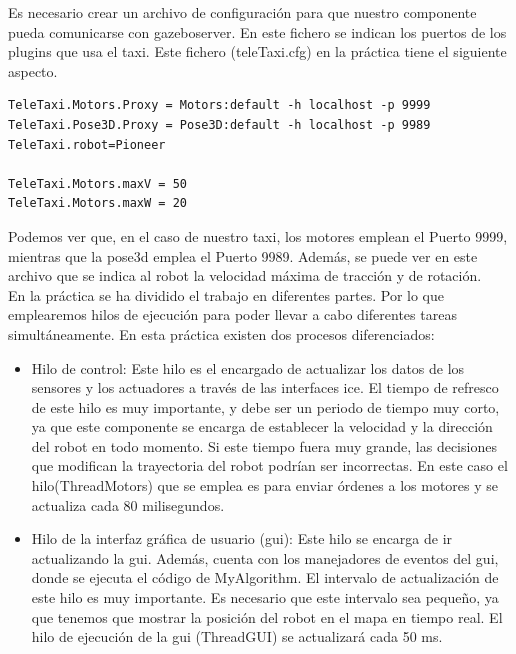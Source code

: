Es necesario crear un archivo de configuración para que nuestro componente pueda comunicarse con gazeboserver. En este fichero se indican los puertos de los plugins que usa el taxi. Este fichero (teleTaxi.cfg) en la práctica tiene el siguiente aspecto.

\vspace{20pt}
	\begin{lstlisting}[frame=single]
TeleTaxi.Motors.Proxy = Motors:default -h localhost -p 9999
TeleTaxi.Pose3D.Proxy = Pose3D:default -h localhost -p 9989
TeleTaxi.robot=Pioneer

TeleTaxi.Motors.maxV = 50
TeleTaxi.Motors.maxW = 20

	\end{lstlisting}

Podemos ver que, en el caso de nuestro taxi, los motores emplean el Puerto 9999, mientras que la pose3d emplea el Puerto 9989. Además, se puede ver en este archivo que se indica al robot la velocidad máxima de tracción y de rotación.\\


En la práctica se ha dividido el trabajo en diferentes partes. Por lo que emplearemos hilos de ejecución para poder llevar a cabo diferentes tareas simultáneamente. En esta práctica existen dos procesos diferenciados:

\begin{itemize}
\item Hilo de control: Este hilo es el encargado de actualizar los datos de los sensores y los actuadores a través de las interfaces \acrshort{ice}. El tiempo de refresco de este hilo es muy importante, y debe ser un periodo de tiempo muy corto, ya que este componente se encarga de establecer la velocidad y la dirección del robot en todo momento. Si este tiempo fuera muy grande, las decisiones que modifican la trayectoria del robot podrían ser incorrectas. En este caso el hilo(ThreadMotors) que se emplea es para enviar órdenes a los motores y se actualiza cada 80 milisegundos.

\item	Hilo de la interfaz gráfica de usuario (\acrshort{gui}): Este hilo se encarga de ir actualizando la \acrshort{gui}. Además, cuenta con los manejadores de eventos del \acrshort{gui}, donde se ejecuta el código de MyAlgorithm. El intervalo de actualización de este hilo es muy importante. Es necesario que este intervalo sea pequeño, ya que tenemos que mostrar la posición del robot en el mapa en tiempo real. El hilo de ejecución de la \acrshort{gui} (ThreadGUI) se actualizará cada 50 ms.

\end{itemize}

